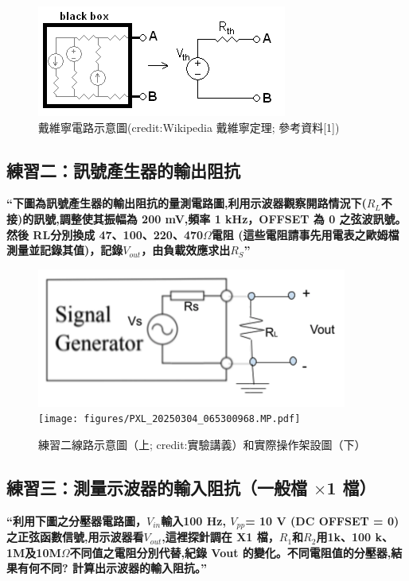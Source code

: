 \documentclass[12pt,a4paper]{article}
\begin{document}
\begin{CJK}{UTF8}{bkai}
\begin{figure}[h]
    \centering
    \includegraphics[width=0.6\linewidth]{figures/Thevenin_equivalent.png}
    \caption{戴維寧電路示意圖(credit:Wikipedia 戴維寧定理; 參考資料[1])}
    \label{fig:thevenin}
\end{figure}



\subsection{練習二：訊號產生器的輸出阻抗}\label{subsec:step_2}
\hfill

\textbf{“下圖為訊號產生器的輸出阻抗的量測電路圖,利用示波器觀察開路情況下($R_{L}$不接)的訊號,調整使其振幅為 200 mV,頻率 1 kHz，OFFSET 為 0 之弦波訊號。 然後 RL分別換成 47、100、220、470$\Omega$電阻 (這些電阻請事先用電表之歐姆檔測量並記錄其值)，記錄$V_{out}$，由負載效應求出$R_{S}$”}


\begin{figure}[h]
    \centering
    \includegraphics[width=0.5\linewidth, angle=0]{figures/exp_2.png}\\
    \texttt{[image: figures/PXL\_20250304\_065300968.MP.pdf]}
    \caption{練習二線路示意圖（上; credit:實驗講義）和實際操作架設圖（下）}
    \label{fig:exp_4}
\end{figure}




\clearpage
\subsection{練習三：測量示波器的輸入阻抗（一般檔 $\times$1 檔）}\label{subsec:step_3}
\hfill

\textbf{“利用下圖之分壓器電路圖，$V_{in}$輸入100 Hz, $V_{pp}$= 10 V (DC OFFSET = 0)之正弦函數信號,用示波器看$V_{out}$,這裡探針調在 X1 檔，$R_{1}$和$R_{2}$用1k、100 k、1M及10M$\Omega$不同值之電阻分別代替,紀錄 Vout 的變化。不同電阻值的分壓器,結果有何不同? 計算出示波器的輸入阻抗。”}


\end{CJK}
\end{document}
